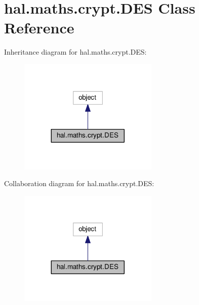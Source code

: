 \hypertarget{classhal_1_1maths_1_1crypt_1_1_d_e_s}{}\section{hal.\+maths.\+crypt.\+D\+ES Class Reference}
\label{classhal_1_1maths_1_1crypt_1_1_d_e_s}


Inheritance diagram for hal.\+maths.\+crypt.\+D\+ES\+:
\nopagebreak
\begin{figure}[H]
\begin{center}
\leavevmode
\includegraphics[width=188pt]{classhal_1_1maths_1_1crypt_1_1_d_e_s__inherit__graph}
\end{center}
\end{figure}


Collaboration diagram for hal.\+maths.\+crypt.\+D\+ES\+:
\nopagebreak
\begin{figure}[H]
\begin{center}
\leavevmode
\includegraphics[width=188pt]{classhal_1_1maths_1_1crypt_1_1_d_e_s__coll__graph}
\end{center}
\end{figure}
